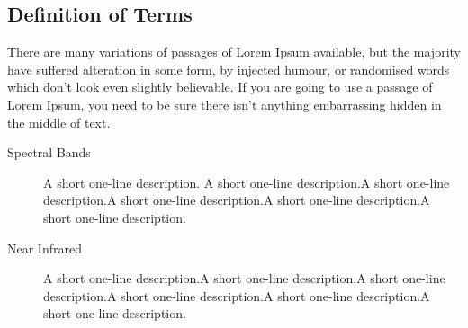 \subsection{Definition of Terms}
There are many variations of passages of Lorem Ipsum\cite{DUMMY:3} available, but the majority have suffered alteration in some form, by injected humour, or randomised words which don't look even slightly believable. If you are going to use a passage of Lorem Ipsum, you need to be sure there isn't anything embarrassing hidden in the middle of text.
\begin{description}
	\item[Spectral Bands] A short one-line description. A short one-line description.A short one-line description.A short one-line description.A short one-line description.A short one-line description.
	\item[Near Infrared] A short one-line description.A short one-line description.A short one-line description.A short one-line description.A short one-line description.A short one-line description.
\end{description}